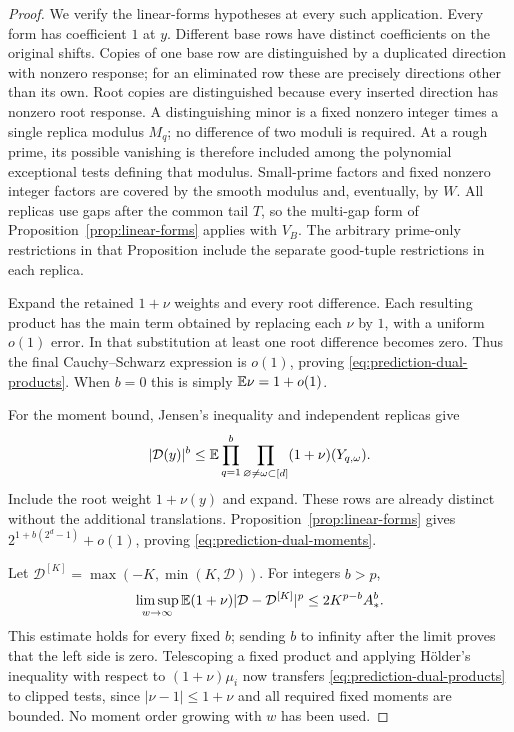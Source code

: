\begin{proof}
We verify the linear-forms hypotheses at every such application.
Every form has coefficient $1$ at $y$.  Different base rows have distinct
coefficients on the original shifts.  Copies of one base row are
distinguished by a duplicated direction with nonzero response; for an
eliminated row these are precisely directions other than its own.
Root copies are distinguished because every inserted direction has
nonzero root response.  A distinguishing minor is a fixed nonzero
integer times a single replica modulus $M_q$; no difference of two
moduli is required.  At a rough prime, its possible vanishing
is therefore included among the polynomial exceptional tests defining
that modulus.  Small-prime factors and fixed nonzero integer factors
are covered by the smooth modulus and, eventually, by $W$.
All replicas use gaps after the common tail $T$, so the multi-gap form
of Proposition~\ref{prop:linear-forms} applies with $V_B$.
The arbitrary prime-only restrictions in that Proposition include the
separate good-tuple restrictions in each replica.

Expand the retained $1+\nu$ weights and every root difference.  Each
resulting product has the main term obtained by replacing each $\nu$
by $1$, with a uniform $o(1)$ error.  In that substitution at least one
root difference becomes zero.  Thus the final Cauchy--Schwarz expression
is $o(1)$, proving \eqref{eq:prediction-dual-products}.  When $b=0$ this
is simply $\mathbb E\nu=1+o(1)$.

For the moment bound, Jensen's inequality and independent replicas give
\[
 |\mathcal D(y)|^b\leq
 \mathbb E\prod_{q=1}^b\prod_{\varnothing\ne\omega\subset[d]}
 (1+\nu)(Y_{q,\omega}).
\]
Include the root weight $1+\nu(y)$ and expand.  These rows are already
distinct without the additional translations.  Proposition~\ref{prop:linear-forms}
gives $2^{1+b(2^d-1)}+o(1)$, proving
\eqref{eq:prediction-dual-moments}.

Let $\mathcal D^{[K]}=\max(-K,\min(K,\mathcal D))$.  For integers $b>p$,
\[
 \limsup_{w\to\infty}
 \mathbb E(1+\nu)|\mathcal D-\mathcal D^{[K]}|^p
 \leq 2K^{p-b}A_*^b.
\]
This estimate holds for every fixed $b$; sending $b$ to infinity after
the limit proves that the left side is zero.  Telescoping a fixed
product and applying H\"older's inequality with respect to
$(1+\nu)\mu_i$ now transfers
\eqref{eq:prediction-dual-products} to clipped tests, since
$|\nu-1|\leq1+\nu$ and all required fixed moments are bounded.  No
moment order growing with $w$ has been used.
\end{proof}

